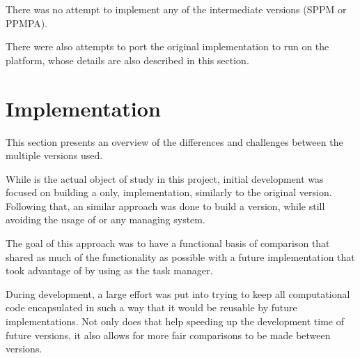 \documentclass[main.tex]{subfiles}
\begin{document}
There was no attempt to implement any of the intermediate versions (SPPM or PPMPA).

There were also attempts to port the original implementation to run on the \mic platform, whose details are also described in this section.




\section{Implementation}

This section presents an overview of the differences and challenges between the multiple versions used.

While \starpu is the actual object of study in this project, initial development was focused on building a \cpu only, implementation, similarly to the original version. Following that, an similar approach was done to build a \cuda version, while still avoiding the usage of \starpu or any \hetplat managing system.

The goal of this approach was to have a functional basis of comparison that shared as much of the functionality as possible with a future implementation that took advantage of \hetplats by using \starpu as the task manager.

During development, a large effort was put into trying to keep all computational code encapsulated in such a way that it would be reusable by future implementations. Not only does that help speeding up the development time of future versions, it also allows for more fair comparisons to be made between versions.






\end{document}
